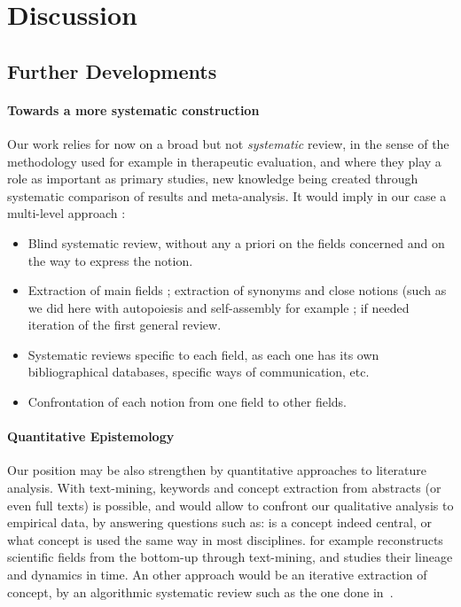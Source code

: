 \documentclass[fleqn,10pt]{wlscirep}
\begin{document}
\section*{Discussion}

\subsection*{Further Developments}

\paragraph{Towards a more systematic construction}


Our work relies for now on a broad but not \emph{systematic} review, in the sense of the methodology used for example in therapeutic evaluation, and where they play a role as important as primary studies, new knowledge being created through systematic comparison of results and meta-analysis. It would imply in our case a multi-level approach :
\begin{itemize}
\item Blind systematic review, without any a priori on the fields concerned and on the way to express the notion.
\item Extraction of main fields ; extraction of synonyms and close notions (such as we did here with autopoiesis and self-assembly for example ; if needed iteration of the first general review.
\item Systematic reviews specific to each field, as each one has its own bibliographical databases, specific ways of communication, etc.
\item Confrontation of each notion from one field to other fields.
\end{itemize}



\paragraph{Quantitative Epistemology}

Our position may be also strengthen by quantitative approaches to literature analysis. With text-mining, keywords and concept extraction from abstracts (or even full texts) is possible, and would allow to confront our qualitative analysis to empirical data, by answering questions such as: is a concept indeed central, or what concept is used the same way in most disciplines. \cite{chavalarias2013phylomemetic} for example reconstructs scientific fields from the bottom-up through text-mining, and studies their lineage and dynamics in time. An other approach would be an iterative extraction of concept, by an algorithmic systematic review such as the one done in~\cite{raimbault2015models}.
\end{document}
